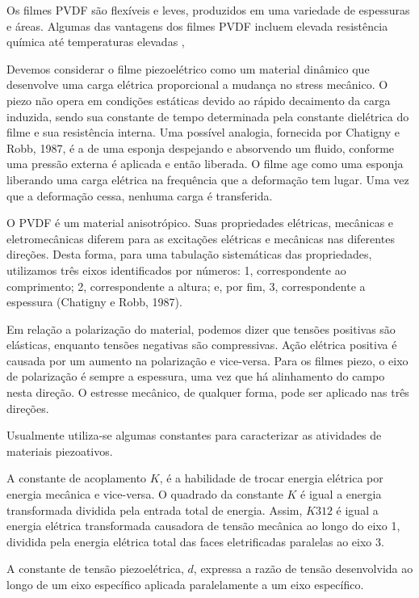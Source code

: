 \documentclass[
	12pt,				
	oneside,			
	a4paper,			
	english,			
	brazil				
	]{abntex2ppgsi}
\begin{document}
Os filmes PVDF são flexíveis e leves, produzidos em uma variedade de espessuras e áreas. Algumas das vantagens dos filmes PVDF incluem elevada resistência química até temperaturas elevadas , 

Devemos considerar o filme piezoelétrico como um material dinâmico que desenvolve uma carga elétrica proporcional a mudança no stress mecânico. O piezo não opera em condições estáticas devido ao rápido decaimento da carga induzida, sendo sua constante de tempo determinada pela constante dielétrica do filme e sua resistência interna. 	Uma possível analogia, fornecida por Chatigny e Robb, 1987, é a de uma esponja despejando e absorvendo um fluido, conforme uma pressão externa é aplicada e então liberada. O filme age como uma esponja liberando uma carga elétrica na frequência que a deformação tem lugar. Uma vez que a deformação cessa, nenhuma carga é transferida. 

O PVDF é um material anisotrópico.  Suas propriedades elétricas, mecânicas e eletromecânicas diferem para as excitações elétricas e mecânicas nas diferentes direções. Desta forma, para uma tabulação sistemáticas das propriedades, utilizamos três eixos identificados por números: 1, correspondente ao comprimento; 2, correspondente a altura; e, por fim, 3, correspondente a espessura (Chatigny e Robb, 1987). 

Em relação a polarização do material, podemos dizer que tensões positivas são elásticas, enquanto tensões negativas são compressivas. Ação elétrica positiva é causada por um aumento na polarização e vice-versa. Para os filmes piezo, o eixo de polarização é sempre a espessura, uma vez que há alinhamento do campo nesta direção. O estresse mecânico, de qualquer forma, pode ser aplicado nas três direções. 

Usualmente utiliza-se algumas constantes para caracterizar as atividades de materiais piezoativos. 

A constante de acoplamento $K$, é a habilidade de trocar energia elétrica por energia mecânica e vice-versa. O quadrado da constante $K$ é igual a energia transformada dividida pela entrada total de energia. Assim, $K312$ é igual a energia elétrica transformada causadora de tensão mecânica ao longo do eixo 1, dividida pela energia elétrica total das faces eletrificadas paralelas ao eixo 3. 

A constante de tensão piezoelétrica, $d$, expressa a razão de tensão desenvolvida ao longo de um eixo específico aplicada paralelamente a um eixo específico. 
\end{document}
